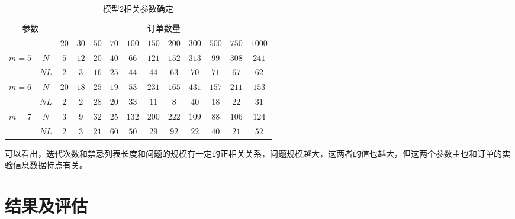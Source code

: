 \begin{table}[h]
\centering
\caption{模型$2$相关参数确定}
\begin{tabular}{ccccccccccccc}
\toprule
\multicolumn{2}{c}{\multirow{2}[0]{*}{参数}} & \multicolumn{11}{c}{订单数量} \\
\multicolumn{2}{c}{}		  & $20 $   & $30$    & $50$    & $70$    & $100$   & $150 $  & $200$   & $300$   & $500$   & $750$   & $1000$ \\
\midrule
\multirow{2}[0]{*}{$m=5$}&$N$& $5$     & $12$    & $20$    & $40$    & $66$    & $121$   & $152$   & $313$  & $99$  & $308$   & $241$ \\
     			  & $NL$&   $2$    & $3$     & $16$     & $25$   & $44$    & $44$     & $63$     & $70$    & $71$    & $67$   & $62$ \\
\multirow{2}[0]{*}{$m=6$}&$N$& $20$    & $18$    & $25$    & $19$    & $53$   & $231$   & $165$   & $431$    &  $157 $   &  $211 $ &$153$  \\
		            & $NL$ & $2$     & $2$      & $28$     & $20$    & $33$    & $11$     & $8$     & $40$   & $18$    & $22$   & $31$ \\
\multirow{2}[0]{*}{$m=7$}& $N$& $3$     & $9$    &$ 32    $    &$ 25 $  &$ 132  $&$ 200   $&$ 222   $&$ 109   $&$88     $   & $   106 $&$124  $\\
 		          &$ NL    $&$ 2     $&$ 3     $&$ 21     $&$ 60   $  &  $50   $  &  $29 $ &$ 92   $  &$ 22    $&$ 40   $   &$ 21   $&$ 52 $\\
\bottomrule
\end{tabular}
\label{tab:model2para}
\end{table}
可以看出，迭代次数和禁忌列表长度和问题的规模有一定的正相关关系，问题规模越大，这两者的值也越大，但这两个参数主也和订单的实验信息数据特点有关。
 
\section{结果及评估}
